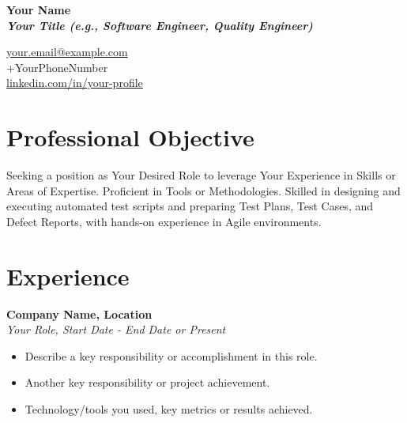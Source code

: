 \documentclass[a4paper,10pt]{article}
\begin{document}
\begin{minipage}[t]{0.7\textwidth}
    \vspace{-1cm}
    {\Huge\bfseries Your Name} \\
    \textbf{\textit{Your Title (e.g., Software Engineer, Quality Engineer)}}
\end{minipage}
\begin{minipage}[t]{0.3\textwidth}
    \vspace{-1cm}
    \raggedleft
    \faEnvelope \hspace{1mm} \href{mailto:your.email@example.com}{your.email@example.com} \\
    \faPhone \hspace{1mm} +YourPhoneNumber \\
    \faLinkedinSquare \hspace{1mm} \href{https://www.linkedin.com/in/your-profile}{linkedin.com/in/your-profile}
\end{minipage}

\vspace{5mm}

\section*{Professional Objective}
Seeking a position as {Your Desired Role} to leverage {Your Experience} in {Skills or Areas of Expertise}. Proficient in {Tools or Methodologies}. Skilled in designing and executing automated test scripts and preparing Test Plans, Test Cases, and Defect Reports, with hands-on experience in Agile environments.

\section*{Experience}
\textbf{{Company Name}, {Location}} \\
\textit{{Your Role}, {Start Date} - {End Date or Present}} \\
\begin{itemize}[left=0pt, label=$\bullet$, topsep=3pt]
    \item {Describe a key responsibility or accomplishment in this role}.
    \item {Another key responsibility or project achievement}.
    \item {Technology/tools you used, key metrics or results achieved}.
\end{itemize}
\end{document}
